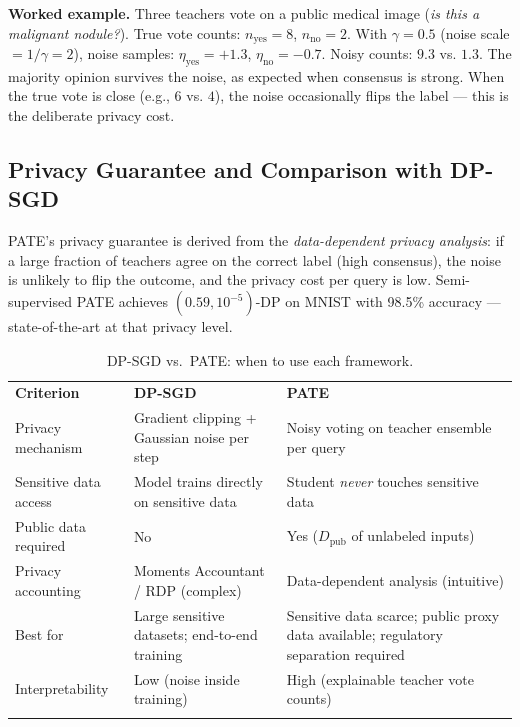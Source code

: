 \textbf{Worked example.}
Three teachers vote on a public medical image (\textit{is this a malignant nodule?}). True vote counts: $n_{\mathrm{yes}} = 8$, $n_{\mathrm{no}} = 2$.  With $\gamma = 0.5$ (noise scale $= 1/\gamma = 2$), noise samples: $\eta_{\mathrm{yes}} = +1.3$, $\eta_{\mathrm{no}} = -0.7$.  Noisy counts: $9.3$ vs. $1.3$. The majority opinion survives the noise, as expected when consensus is strong. When the true vote is close (e.g., $6$ vs. $4$), the noise occasionally flips the label — this is the deliberate privacy cost.

\subsection{Privacy Guarantee and Comparison with DP-SGD}
\label{subsec:pate_privacy}

PATE's privacy guarantee is derived from the \emph{data-dependent privacy analysis}: if a large fraction of teachers agree on the correct label (high consensus), the noise is unlikely to flip the outcome, and the privacy cost per query is low. Semi-supervised PATE achieves $(0.59, 10^{-5})$-DP on MNIST with 98.5\% accuracy \cite{papernot2017} — state-of-the-art at that privacy level.

\begin{table}[ht]
\centering
\caption{DP-SGD vs.\ PATE: when to use each framework.}
\label{tab:dpsgd_vs_pate}
\begin{tabular}{p{4.0cm} p{4.5cm} p{4.5cm}}
\hline\noalign{\smallskip}
\textbf{Criterion} & \textbf{DP-SGD} & \textbf{PATE} \\
\noalign{\smallskip}\svhline\noalign{\smallskip}
Privacy mechanism & Gradient clipping + Gaussian noise per step & Noisy voting on teacher ensemble per query \\[3pt]
Sensitive data access & Model trains directly on sensitive data & Student \emph{never} touches sensitive data \\[3pt]
Public data required & No & Yes ($D_{\mathrm{pub}}$ of unlabeled inputs) \\[3pt]
Privacy accounting & Moments Accountant / RDP (complex) & Data-dependent analysis (intuitive) \\[3pt]
Best for & Large sensitive datasets; end-to-end training & Sensitive data scarce; public proxy data available; regulatory separation required \\[3pt]
Interpretability & Low (noise inside training) & High (explainable teacher vote counts) \\
\noalign{\smallskip}\hline\noalign{\smallskip}
\end{tabular}
\end{table}

